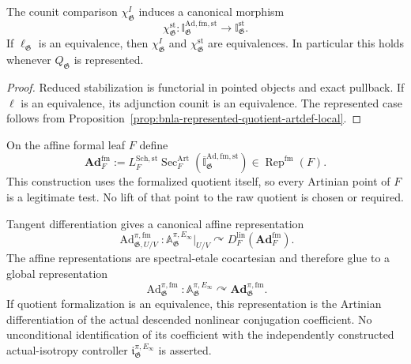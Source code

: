 \begin{proposition}
\label{prop:as-formalized-actual-adjoint-stable}
The counit comparison
$\chi_{\mathfrak G}^{I}$ induces a canonical morphism
\[
\boxed{
    \chi_{\mathfrak G}^{\mathrm{st}}:
    \mathbb I_{\mathfrak G}^{\mathrm{Ad,fm,st}}
    \longrightarrow
    \mathbb I_{\mathfrak G}^{\mathrm{st}}.
}
\]
If $\ell_{\mathfrak G}$ is an equivalence, then
$\chi_{\mathfrak G}^{I}$ and
$\chi_{\mathfrak G}^{\mathrm{st}}$ are equivalences.  In particular this
holds whenever $Q_{\mathfrak G}$ is represented.
\end{proposition}

\begin{proof}
Reduced stabilization is functorial in pointed objects and exact pullback.
If $\ell$ is an equivalence, its adjunction counit is an equivalence.  The
represented case follows from
Proposition~\ref{prop:bnla-represented-quotient-artdef-local}.
\end{proof}

\begin{construction}
\label{con:as-formalized-adjoint-linearization}
On the affine formal leaf $F$ define
\[
\boxed{
    \mathbf{Ad}_{F}^{\mathrm{fm}}
    :=
    L_F^{\mathrm{Sch,st}}
    \operatorname{Sec}^{\mathrm{Art}}_F
    \left(
        \overline{\mathbb I}_{\mathfrak G}^{\mathrm{Ad,fm,st}}
    \right)
    \in
    \operatorname{Rep}^{\mathrm{fm}}(F).
}
\]
This construction uses the formalized quotient itself, so every Artinian
point of $F$ is a legitimate test.  No lift of that point to the raw quotient
is chosen or required.
\end{construction}

\begin{theorem}
\label{thm:as-differentiated-adjoint-representation}
Tangent differentiation gives a canonical affine representation
\[
\boxed{
    \operatorname{Ad}^{\pi,\mathrm{fm}}_{\mathfrak G,U/V}:
    \mathbb A_{\mathfrak G}^{\pi,E_\infty}|_{U/V}
    \curvearrowright
    D_F^{\mathrm{lin}}
    \left(
        \mathbf{Ad}_{F}^{\mathrm{fm}}
    \right).
}
\]
The affine representations are spectral-etale cocartesian and therefore glue
to a global representation
\[
\boxed{
    \operatorname{Ad}^{\pi,\mathrm{fm}}_{\mathfrak G}:
    \mathbb A_{\mathfrak G}^{\pi,E_\infty}
    \curvearrowright
    \mathbf{Ad}_{\mathfrak G}^{\pi,\mathrm{fm}}.
}
\]
If quotient formalization is an equivalence, this representation is the
Artinian differentiation of the actual descended nonlinear conjugation
coefficient.  No unconditional identification of its coefficient with the
independently constructed actual-isotropy controller
$\mathfrak i_{\mathfrak G}^{\pi,E_\infty}$ is asserted.
\end{theorem}

